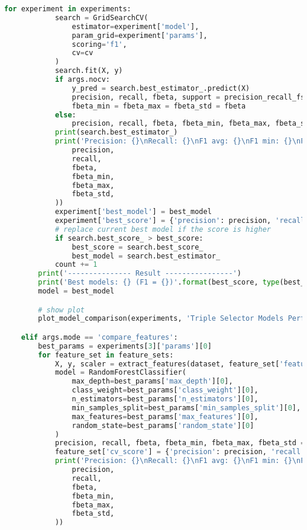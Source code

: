 \begin{lstlisting}[language=Python]
        for experiment in experiments:
            search = GridSearchCV(
                estimator=experiment['model'],
                param_grid=experiment['params'],
                scoring='f1',
                cv=cv
            )
            search.fit(X, y)
            if args.nocv:
                y_pred = search.best_estimator_.predict(X)
                precision, recall, fbeta, support = precision_recall_fscore_support(y, y_pred, average='binary')
                fbeta_min = fbeta_max = fbeta_std = fbeta
            else:
                precision, recall, fbeta, fbeta_min, fbeta_max, fbeta_std = cross_validate_precision_recall_fbeta(search.best_estimator_, X, y, cv)
            print(search.best_estimator_)
            print('Precision: {}\nRecall: {}\nF1 avg: {}\nF1 min: {}\nF1 max: {}\nF1 std: {}\n'.format(
                precision,
                recall,
                fbeta,
                fbeta_min,
                fbeta_max,
                fbeta_std,
            ))
            experiment['best_model'] = best_model
            experiment['best_score'] = {'precision': precision, 'recall': recall, 'f1': fbeta}
            # replace current best model if the score is higher
            if search.best_score_ > best_score:
                best_score = search.best_score_
                best_model = search.best_estimator_
            count += 1
        print('--------------- Result ----------------')
        print('Best models: {} (F1 = {})'.format(best_score, type(best_model).__name__))
        model = best_model

        # show plot
        plot_model_comparison(experiments, 'Triple Selector Models Performance', cv, score_field='best_score')

    elif args.mode == 'compare_features':
        best_params = experiments[3]['params'][0]
        for feature_set in feature_sets:
            X, y, scaler = extract_features(dataset, feature_set['features'])
            model = RandomForestClassifier(
                max_depth=best_params['max_depth'][0],
                class_weight=best_params['class_weight'][0],
                n_estimators=best_params['n_estimators'][0],
                min_samples_split=best_params['min_samples_split'][0],
                max_features=best_params['max_features'][0],
                random_state=best_params['random_state'][0]
            )
            precision, recall, fbeta, fbeta_min, fbeta_max, fbeta_std = cross_validate_precision_recall_fbeta(model, X, y, cv)
            feature_set['cv_score'] = {'precision': precision, 'recall': recall, 'f1': fbeta}
            print('Precision: {}\nRecall: {}\nF1 avg: {}\nF1 min: {}\nF1 max: {}\nF1 std: {}\n'.format(
                precision,
                recall,
                fbeta,
                fbeta_min,
                fbeta_max,
                fbeta_std,
            ))


\end{lstlisting}
